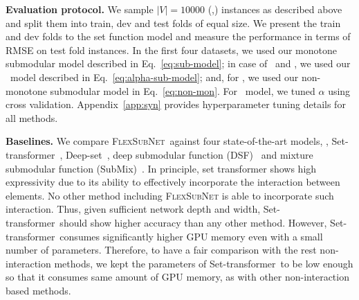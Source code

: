\documentclass{article}
\newcommand{\our}{\textsc{Flex\-Sub\-Net}}
\newcommand{\xhdr}[1]{\noindent\textbf{#1.}}
\renewcommand{\cite}{\citep}
\newcommand{\deepset}{Deep-set}
\newcommand{\settx}{Set-transformer}
\begin{document}
\xhdr{Evaluation protocol}
We sample $|V|{=}10000$ (\tset,\tvalue) instances as described above 
and split them into train, dev and test folds of equal size. We present the train and dev folds to the set function model and measure the performance in terms of RMSE on test fold instances.
%
In the first four datasets, we used our monotone submodular model described in Eq.~\eqref{eq:sub-model}; in case of \logxsqrt\ and \logxdet, we used our \asb\ model described in Eq.~\eqref{eq:alpha-sub-model}; and, for \gcutn, we used our non-monotone submodular model in Eq.~\eqref{eq:non-mon}.
%
For \asb\ model, we tuned $\alpha$ using cross validation.
Appendix~\ref{app:syn} provides hyperparameter tuning details for all methods.

\xhdr{Baselines} We compare \our\ against four state-of-the-art models, \viz,
\settx~\cite{lee2019set}, \deepset~\cite{zaheer2017deep}, deep submodular function (DSF)~\cite{bilmes2017deep} and mixture submodular function (SubMix)~\cite{tschiatschek2014learning}. In principle, set transformer shows high expressivity due to its ability to effectively incorporate the interaction between elements.
No other method including \our{} is able to incorporate such interaction. Thus, given sufficient network depth and width,
\settx\ should show higher accuracy than any other method. However, \settx\ consumes significantly higher GPU memory even with a small number of parameters. Therefore, to have a fair comparison with the rest non-interaction methods, we kept the parameters of \settx\ to be low enough so that it consumes same amount of GPU memory, as with other non-interaction based methods.

\end{document}
